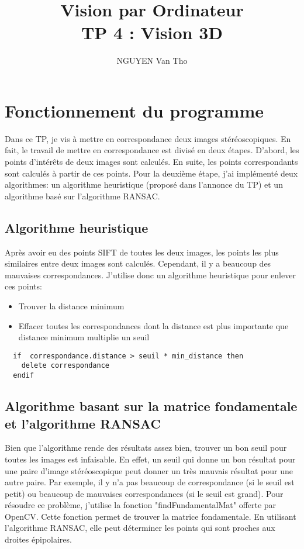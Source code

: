 \documentclass[french,12pt,a4paper,oneside,notitlepage]{report}
\makeatletter
\let\LaTeX@startsection\@startsection
\renewcommand{\@startsection}[6]{\LaTeX@startsection%
{#1}{#2}{#3}{#4}{#5}{\color{bl}\raggedright #6}}
\renewcommand\paragraph{\@startsection{paragraph}{4}{\z@}%
  {-3.25ex\@plus -1ex \@minus -.2ex}%
  {1.5ex \@plus .2ex}%
  {\normalfont\normalsize\bfseries}}
\newcommand\yourName{NGUYEN Van Tho}
\newcommand\yourTitle{\Huge Vision par Ordinateur\\ \Large TP 4 : Vision 3D}
\makeatother
\begin{document}
\author{\yourName}
\title{\yourTitle}
\maketitle
\section{Fonctionnement du programme}

Dans ce TP, je vis à mettre en correspondance deux images stéréoscopiques. En fait, le 
travail de mettre en correspondance est divisé en deux étapes. D'abord, les points 
d'intérêts de deux images sont calculés. En suite, les points correspondants sont 
calculés à partir de ces points. Pour la deuxième étape, j'ai implémenté deux algorithmes:
un algorithme heuristique (proposé dans l'annonce du TP) et un algorithme basé sur 
l'algorithme RANSAC.
\subsection{Algorithme heuristique}
Après avoir eu des points SIFT de toutes les deux images, les points les plus similaires 
entre deux images sont calculés. Cependant, il y a beaucoup des mauvaises 
correspondances. J'utilise donc un algorithme heuristique pour enlever ces points:
\begin{itemize}
 \item Trouver la distance minimum
 \item Effacer toutes les correspondances dont la distance est plus importante que 
distance minimum multiplie un seuil
\end{itemize}
\begin{lstlisting}
  if  correspondance.distance > seuil * min_distance then
	delete correspondance
  endif
\end{lstlisting}

\subsection{Algorithme basant sur la matrice fondamentale et l'algorithme RANSAC}
Bien que l'algorithme rende des résultats assez bien, trouver un bon seuil pour toutes 
les images est infaisable. En effet, un seuil qui donne un bon résultat pour une paire 
d'image stéréoscopique peut donner un très mauvais résultat pour une autre paire. Par 
exemple, il y n'a pas beaucoup de correspondance (si le seuil est petit) ou beaucoup de 
mauvaises correspondances (si le seuil est grand). Pour résoudre ce problème, j'utilise 
la fonction "findFundamentalMat" offerte par OpenCV. Cette fonction permet de trouver la 
matrice fondamentale. En utilisant l'algorithme RANSAC, elle peut déterminer les points 
qui sont proches aux droites épipolaires.
\end{document}
